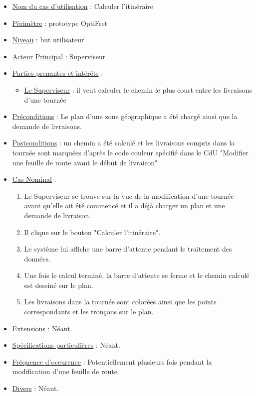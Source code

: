 \documentclass[a4paper]{article}
\begin{document}
\begin{itemize}[label = \textbullet, font = \color{orange}]
    \item \underline{Nom du cas d'utilisation} : Calculer l'itinéraire
    \item \underline{Périmètre} : prototype OptiFret
    \item \underline{Niveau} : but utilisateur
    \item \underline{Acteur Principal} : Superviseur
    \item \underline{Parties prenantes et intérêts} :
    \begin{itemize}[label = \textbullet, font = \color{blue}]
        \item \underline{Le Superviseur} : il veut calculer le chemin le plus
            court entre les livraisons d'une tournée
    \end{itemize}
    \item \underline{Préconditions} : Le plan d'une zone géographique a été
        chargé ainsi que la demande de livraisons.
    \item \underline{Postconditions} : un chemin a été calculé et les
        livraisons compris dans la tournée sont marquées d'après le code
        couleur spécifié dans le CdU "Modifier une feuille de route avant le
        début de livraison"
    \item \underline{Cas Nominal} :
    \begin{enumerate}
        \item Le Superviseur se trouve sur la vue de la modification d'une
            tournée avant qu'elle ait été commencé et il a déjà charger un plan
            et une demande de livraison.
        \item Il clique sur le bouton "Calculer l'itinéraire".
        \item Le système lui affiche une barre d'attente pendant le traitement
            des données.
        \item Une fois le calcul terminé, la barre d'attente se ferme et le
            chemin calculé est dessiné sur le plan.
        \item Les livraisons dans la tournée sont colorées ainsi que les points
            correspondants et les tronçons sur le plan.
    \end{enumerate}
    \item \underline{Extensions} : Néant.
    \item \underline{Spécifications particulières} : Néant.
    \item \underline{Fréquence d'occurence} : Potentiellement plusieurs fois
        pendant la modification d'une feuille de route.
    \item \underline{Divers} : Néant.
\end{itemize}
\end{document}
